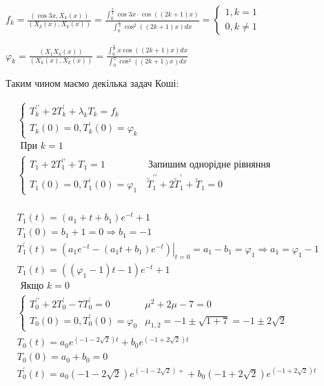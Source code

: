 \begin{center}
    $f_{k}=\frac{(\cos 3 x, X_k(x))}{(X_k(x), X_k(x))}=\frac{\int_0^{\frac{\pi}{2}} \cos 3 x \cdot \cos ((2 k+1) x)}{\int_0^{\frac{\pi}{2}} \cos ^2 ((2 k+1) x) d x}= \begin{cases}
    1, k=1 \\
    0, k \neq 1
    \end{cases} $ 
    
    
    $ \varphi_k=\frac{(X_1 X_k(x))}{(X_k(x), X_k(x))}=\frac{\int_{0}^{\frac{\pi}{2}} x \cos ((2 k+1) x) d x}{\int_0^\pi \cos ^2((2 k+1) x) d x}$


    Таким чином маємо декілька задач Коші:


    $\begin{aligned}
    & \left\{\begin{array}{l}
    T_k^{\prime \prime}+2 T_k^{\prime}+\lambda_k T_k=f_k \\
    T_k(0)=0, T_k^{\prime}(0)=\varphi_k
    \end{array}\right. \\
    & \text { При } k=1 \\
    & \begin{cases}T_1+2 T_1^{\prime \prime}+T_1=1 & \text { Запишим однорідне рівняння } \\
    T_{1}(0)=0, T_1^{\prime}(0)=\varphi_1 & \ \tilde{T}_1^{\prime \prime}+2 \tilde{T}_1^{\prime}+\tilde{T}_1=0\end{cases} \\
    &
    \end{aligned}
    $

    $\begin{aligned} & T_1(t)=(a_1+t+b_1) e^{-t}+ 1 \\ & T_1(0)=b_1+1=0 \Rightarrow b_1=-1 \\ & T_1^{\prime}(t)=\left.\left(a_1 e^{-t}-\left(a_1 t+b_1\right) e^{-t}\right)\right|_{t=0}=a_1-b_1=\varphi_1 \Rightarrow a_1=\varphi_{1} - 1 \\ & T_1(t)=\left(\left(\varphi_1 - 1\right) t-1\right) e^{-t}+1 \\ & \text { Якщо } k=0 \\ & \begin{cases}T_0^{\prime \prime}+2 T_0^{\prime}-7 T_0^{\prime}=0 & \mu^2+2 \mu-7=0 \\ T_0(0)=0, T_0^{\prime}(0)=\varphi_0 & \mu_{1,2}=-1 \pm \sqrt{1+7}=-1 \pm 2 \sqrt{2}\end{cases} \\ & T_0(t)=a_0 e^{(-1- 2 \sqrt{2}) t}+b_0 e^{(-1+2 \sqrt{2}) t} \\ & T_0(0)=a_0+b_0=0 \\ & T_0^{\prime}(t)=a_0(-1-2 \sqrt{2}) e^{(-1-2 \sqrt{2})+}+b_0(-1+2 \sqrt{2}) e^{(-1 + 2 \sqrt{2}) t} \\ & \end{aligned}$



\end{center}
